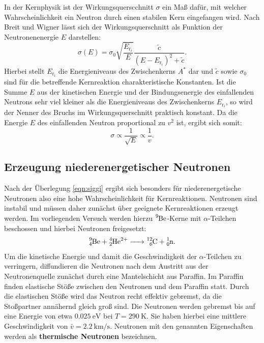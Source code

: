 In der Kernphysik ist der Wirkungsquerscchnitt $\sigma$ ein Maß dafür, mit welcher Wahrscheinlichkeit ein Neutron durch einen stabilen Kern eingefangen wird.
Nach Breit und Wigner lässt sich der Wirkungsquerschnitt als Funktion der Neutronenenergie $E$ darstellen:
\begin{equation}
  \sigma (E)=\sigma _0 \sqrt{\frac{E_{\mathrm{r}_i}}{E}}\frac{\tilde{c}}{\left(E-E_{\mathrm{r}_i}\right)^2 +\tilde{c}} \text{.}
\end{equation}
Hierbei stellt $E_{\mathrm{r}_i}$ die Energieniveaus des Zwischenkerns $A^{*}$ dar und $\tilde{c}$ sowie $\sigma_0$ sind für die betreffende Kernreaktion charakteristische Konstanten.
Ist die Summe $E$ aus der kinetischen Energie und der Bindungsenergie des einfallenden Neutrons sehr viel kleiner als die Energieniveaus des Zwischenkerns $E_{\mathrm{r}_i}$, so wird der Nenner des Bruchs im Wirkungsquerschnitt praktisch konstant. Da die Energie $E$ des einfallenden Neutron proportional zu $v^2$ ist, ergibt sich somit:
\begin{equation}
  \label{eqn:siggi}
  \sigma \propto \frac{1}{\sqrt{E}}\propto \frac{1}{v} \text{.}
\end{equation}

\subsection{Erzeugung niederenergetischer Neutronen}
Nach der Überlegung \ref{eqn:siggi} ergibt sich besonders für niederenergetische Neutronen also eine hohe Wahrscheinlichkeit für Kernreaktionen.
Neutronen sind instabil und müssen daher zunächst über geeignete Kernreaktionen erzeugt werden.
Im vorliegenden Versuch werden hierzu $\ce{^{9}Be}$-Kerne mit $\alpha$-Teilchen beschossen und hierbei Neutronen freigesetzt:
\begin{align}
    \ce{ ^{9}_4Be + ^{4}_2He^{2+}  -> ^{12}_6C + ^{1}_0n}\text{.}
\end{align}
Um die kinetische Energie und damit die Geschwindigkeit der $\alpha$-Teilchen zu verringern, diffundieren die Neutronen nach dem Austritt aus der Neutronenquelle zunächst durch eine Mantelschicht aus Paraffin. Im Paraffin finden elastische Stöße zwischen den Neutronen und dem Paraffin statt. Durch die elastischen Stöße wird das Neutron recht effektiv gebremst, da die Stoßpartner annähernd gleich groß sind.
Die Neutronen werden gebremst bis auf eine Energie von etwa $\SI{0.025}{\electronvolt}$ bei $T=\SI{290}{\kelvin}$. Sie haben hierbei eine mittlere Geschwindigkeit von $\bar{v}=\SI{2.2}{\kilo\meter\per\second}$. Neutronen mit den genannten Eigenschaften werden als \textbf{thermische Neutronen} bezeichnen.

